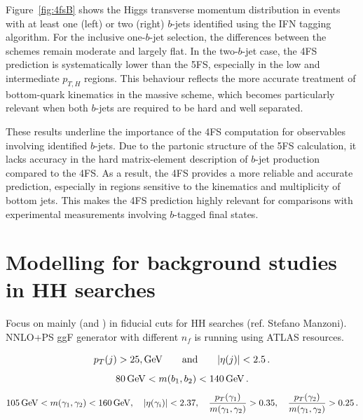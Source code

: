 \documentclass[11pt,a4paper]{article}
\begin{document}

Figure~\ref{fig:4fsB} shows the Higgs transverse momentum distribution in events with at least one (left) or two (right) $b$-jets identified using the IFN tagging algorithm. For the inclusive one-$b$-jet selection, the differences between the schemes remain moderate and largely flat. In the two-$b$-jet case, the 4FS prediction is systematically lower than the 5FS, especially in the low and intermediate $p_{T,H}$ regions. This behaviour reflects the more accurate treatment of bottom-quark kinematics in the massive scheme, which becomes particularly relevant when both $b$-jets are required to be hard and well separated.

These results underline the importance of the 4FS computation for observables involving identified $b$-jets. Due to the partonic structure of the 5FS calculation, it lacks accuracy in the hard matrix-element description of $b$-jet production compared to the 4FS. As a result, the 4FS provides a more reliable and accurate prediction, especially in regions sensitive to the kinematics and multiplicity of bottom jets. This makes the 4FS prediction highly relevant for comparisons with experimental measurements involving $b$-tagged final states.
\section{Modelling \bbH{} for background studies in HH searches}\label{sec:HH}
Focus on  mainly (and ) in fiducial cuts for HH searches (ref. Stefano Manzoni). NNLO+PS ggF generator with different $n_f$ is running using ATLAS resources.

\begin{equation}
\label{eq:ptjcuts}
p_T(j) > 25,\mathrm{GeV} \qquad {\rm and} \qquad |\eta(j)| < 2.5\,.
\end{equation}
\begin{equation}
    \label{eq:mbjcut}
    80\, \mathrm{GeV} < m(b_1,b_2)< 140\,\mathrm{GeV}\,.
\end{equation}
\begin{equation}
\label{eq:photoncuts}
    105\,\mathrm{GeV} < m(\gamma_1, \gamma_2) < 160\,\mathrm{GeV}, \quad |\eta(\gamma_i)|< 2.37, \quad
    \frac{p_T(\gamma_1)}{m(\gamma_1, \gamma_2)} > 0.35, \quad \frac{p_T(\gamma_2)}{m(\gamma_1, \gamma_2)} > 0.25\,.
\end{equation}
\end{document}
